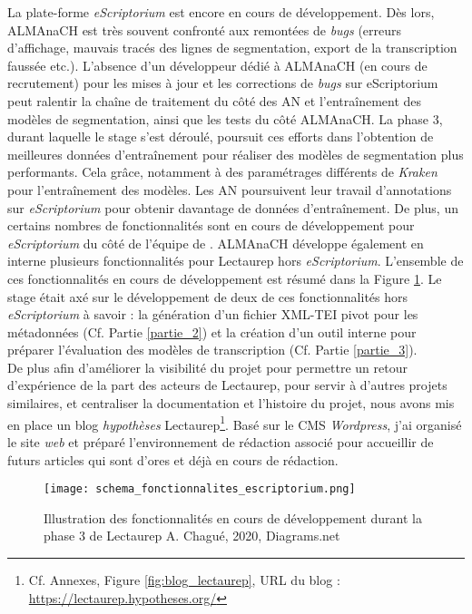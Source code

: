 La plate-forme \textit{eScriptorium} est encore en cours de développement. Dès lors, ALMAnaCH est très souvent confronté aux remontées de \textit{bugs} (erreurs d'affichage, mauvais tracés des lignes de segmentation, export de la transcription faussée etc.). L'absence d'un développeur dédié à ALMAnaCH (en cours de recrutement) pour les mises à jour et les corrections de \textit{bugs} sur eScriptorium peut ralentir la chaîne de traitement du côté des AN et l'entraînement des modèles de segmentation, ainsi que les tests du côté ALMAnaCH. 
\newpage
La phase 3, durant laquelle le stage s'est déroulé, poursuit ces efforts dans l'obtention de meilleures données d'entraînement pour réaliser des modèles de segmentation plus performants. Cela grâce, notamment à des paramétrages différents de \textit{Kraken} pour l'entraînement des modèles. Les AN poursuivent leur travail d'annotations sur \textit{eScriptorium} pour obtenir davantage de données d'entraînement. De plus, un certains nombres de fonctionnalités sont en cours de développement pour \textit{eScriptorium} du côté de l'équipe de . ALMAnaCH développe également en interne plusieurs fonctionnalités pour Lectaurep hors \textit{eScriptorium}. L'ensemble de ces fonctionnalités en cours de développement est résumé dans la Figure \ref{fig:fonctionnalites_eScripto}. Le stage était axé sur le développement de deux de ces fonctionnalités hors \textit{eScriptorium} à savoir : la génération d'un fichier XML-TEI pivot pour les métadonnées (Cf. Partie \ref{partie_2}) et la création d'un outil interne pour préparer l'évaluation des modèles de transcription (Cf. Partie \ref{partie_3}).\\

De plus afin d'améliorer la visibilité du projet pour permettre un retour d'expérience de la part des acteurs de Lectaurep, pour servir à d'autres projets similaires, et centraliser la documentation et l'histoire du projet, nous avons mis en place un blog \textit{hypothèses} Lectaurep\footnote{Cf. Annexes, Figure \ref{fig:blog_lectaurep}, URL du blog : \url{https://lectaurep.hypotheses.org/}}. Basé sur le CMS \textit{Wordpress}, j'ai organisé le site \textit{web} et préparé l'environnement de rédaction associé pour accueillir de futurs articles qui sont d'ores et déjà en cours de rédaction.

\begin{figure}[h!]
  \begin{sideways}
    \texttt{[image: schema\_fonctionnalites\_escriptorium.png]}
  \end{sideways}
  \centering
  \caption{Illustration des fonctionnalités en cours de développement durant la phase 3 de Lectaurep \textcopyright A. Chagué, 2020, Diagrams.net}
  \label{fig:fonctionnalites_eScripto}
\end{figure}
\clearpage

